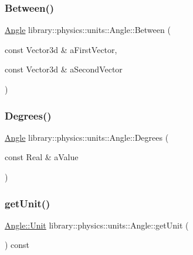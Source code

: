 \subsubsection{\texorpdfstring{Between()}{Between()}\hspace{0.1cm}{\footnotesize\ttfamily [2/2]}}
{\footnotesize\ttfamily \hyperlink{classlibrary_1_1physics_1_1units_1_1_angle}{Angle} library\+::physics\+::units\+::\+Angle\+::\+Between (\begin{DoxyParamCaption}\item[{const Vector3d \&}]{a\+First\+Vector,  }\item[{const Vector3d \&}]{a\+Second\+Vector }\end{DoxyParamCaption})\hspace{0.3cm}{\ttfamily [static]}}

\mbox{\label{classlibrary_1_1physics_1_1units_1_1_angle_a20b061534d7d24f807781a06b191603b}} 
\subsubsection{\texorpdfstring{Degrees()}{Degrees()}}
{\footnotesize\ttfamily \hyperlink{classlibrary_1_1physics_1_1units_1_1_angle}{Angle} library\+::physics\+::units\+::\+Angle\+::\+Degrees (\begin{DoxyParamCaption}\item[{const Real \&}]{a\+Value }\end{DoxyParamCaption})\hspace{0.3cm}{\ttfamily [static]}}

\mbox{\label{classlibrary_1_1physics_1_1units_1_1_angle_a44ca98d9a05643948f5d3bee79bcba63}} 
\subsubsection{\texorpdfstring{get\+Unit()}{getUnit()}}
{\footnotesize\ttfamily \hyperlink{classlibrary_1_1physics_1_1units_1_1_angle_a3c329d415a61783b16ce481874cc5956}{Angle\+::\+Unit} library\+::physics\+::units\+::\+Angle\+::get\+Unit (\begin{DoxyParamCaption}{ }\end{DoxyParamCaption}) const}


